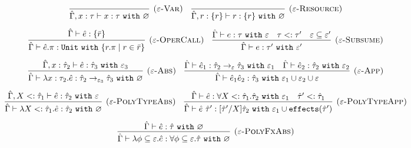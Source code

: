 \documentclass{llncs}
\newcommand{\keywadj}[1]{\mathtt{#1}}
\newcommand{\keyw}[1]{\keywadj{#1}~}
\newcommand{\kw}[1]{\keyw{ #1 }}
\newcommand{\kwa}[1]{\keywadj{ #1 }}
\newcommand{\fx}[1]{ \kwa{effects}(#1) }
\begin{document}
\[
\begin{array}{c}

\infer[\textsc{($\varepsilon$-Var)}]
	{ \hat \Gamma, x:\tau \vdash x: \tau~\kw{with} \varnothing }
	{}
~~~
\infer[\textsc{($\varepsilon$-Resource)}]
 	{ \hat \Gamma, r: \{ r \} \vdash r : \{ r \}~\kw{with} \varnothing }
 	{}\\[2ex]
 	


\infer[\textsc{($\varepsilon$-OperCall)}]
	{ \hat \Gamma \vdash \hat e.\pi: \kw{Unit} \kw{with} \{ r.\pi \mid r \in \bar r \} }
	{ \hat \Gamma \vdash \hat e: \{ \bar r \}}
	~~~

\infer[\textsc{($\varepsilon$-Subsume)}]
	{\hat \Gamma \vdash e: \tau' ~\kw{with} \varepsilon'}
	{\hat \Gamma \vdash e: \tau ~\kw{with} \varepsilon & \tau <: \tau' & \varepsilon \subseteq \varepsilon'}\\[2ex]

	\infer[\textsc{($\varepsilon$-Abs)}]
	{ \hat \Gamma \vdash \lambda x:\tau_2 . \hat e : \hat \tau_2 \rightarrow_{\varepsilon_3} \hat \tau_3~\kw{with} \varnothing }
	{ \hat \Gamma, x: \hat \tau_2 \vdash \hat e: \hat \tau_3~\kw{with} \varepsilon_3 }
	~~~
\infer[\textsc{($\varepsilon$-App)}]
	{ \hat \Gamma \vdash \hat e_1 \hat e_2 : \hat \tau_3~\kw{with} \varepsilon_1 \cup \varepsilon_2 \cup \varepsilon  }
	{ \hat \Gamma \vdash \hat e_1: \hat \tau_2 \rightarrow_{\varepsilon} \hat \tau_3~\kw{with} \varepsilon_1 & \hat \Gamma \vdash \hat e_2: \hat \tau_2~\kw{with} \varepsilon_2 } \\[2ex]

\infer[\textsc{($\varepsilon$-PolyTypeAbs)}]
	{ \hat \Gamma \vdash \lambda X <: \hat \tau_1. \hat e : \hat \tau_2 ~\kw{with} \varnothing }
	{ \hat \Gamma, X <: \hat \tau_1 \vdash \hat e: \hat \tau_2 ~\kw{with} \varepsilon }

~~~

\infer[\textsc{($\varepsilon$-PolyTypeApp)}]
	{ \hat \Gamma \vdash \hat e~\hat \tau' : [\hat \tau'/X]\hat \tau_2~\kw{with} \varepsilon_1 \cup \fx{\hat \tau'} }
	{ \hat \Gamma \vdash \hat e : \forall X <: \hat \tau_1.\hat \tau_2~\kw{with} \varepsilon_1 & \hat \tau' <: \hat \tau_1} \\[2ex]

\infer[\textsc{($\varepsilon$-PolyFxAbs)}]
	{ \hat \Gamma \vdash \lambda \phi \subseteq \varepsilon. \hat e : \forall \phi \subseteq \varepsilon. \hat \tau~\kw{with} \varnothing }
	{ \hat \Gamma \vdash \hat e : \hat \tau ~\kw{with} \varnothing }


\end{array}\]
\end{document}
